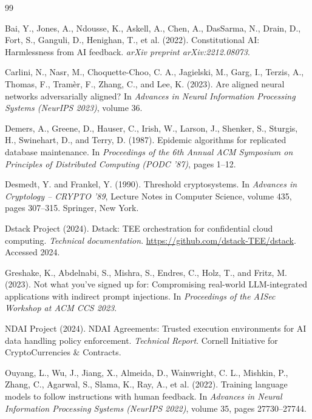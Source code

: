 \documentclass[sigconf,natbib=false]{acmart}
\begin{document}

\begin{thebibliography}{99}

Bai, Y., Jones, A., Ndousse, K., Askell, A., Chen, A., DasSarma, N.,
Drain, D., Fort, S., Ganguli, D., Henighan, T., et al. (2022).
Constitutional AI: Harmlessness from AI feedback.
\textit{arXiv preprint arXiv:2212.08073}.

Carlini, N., Nasr, M., Choquette-Choo, C. A., Jagielski, M.,
Garg, I., Terzis, A., Thomas, F., Tramèr, F., Zhang, C., and
Lee, K. (2023).
Are aligned neural networks adversarially aligned?
In \textit{Advances in Neural Information Processing Systems (NeurIPS 2023)},
volume 36.

Demers, A., Greene, D., Hauser, C., Irish, W., Larson, J., Shenker, S.,
Sturgis, H., Swinehart, D., and Terry, D. (1987).
Epidemic algorithms for replicated database maintenance.
In \textit{Proceedings of the 6th Annual ACM Symposium on Principles of
Distributed Computing (PODC '87)}, pages 1--12.

Desmedt, Y. and Frankel, Y. (1990).
Threshold cryptosystems.
In \textit{Advances in Cryptology -- CRYPTO '89}, Lecture Notes in Computer
Science, volume 435, pages 307--315. Springer, New York.

Dstack Project (2024).
Dstack: TEE orchestration for confidential cloud computing.
\textit{Technical documentation}. \url{https://github.com/dstack-TEE/dstack}.
Accessed 2024.

Greshake, K., Abdelnabi, S., Mishra, S., Endres, C., Holz, T., and
Fritz, M. (2023).
Not what you've signed up for: Compromising real-world LLM-integrated
applications with indirect prompt injections.
In \textit{Proceedings of the AISec Workshop at ACM CCS 2023}.

NDAI Project (2024).
NDAI Agreements: Trusted execution environments for AI data handling
policy enforcement.
\textit{Technical Report}. Cornell Initiative for CryptoCurrencies \& Contracts.

Ouyang, L., Wu, J., Jiang, X., Almeida, D., Wainwright, C. L.,
Mishkin, P., Zhang, C., Agarwal, S., Slama, K., Ray, A., et al. (2022).
Training language models to follow instructions with human feedback.
In \textit{Advances in Neural Information Processing Systems (NeurIPS 2022)},
volume 35, pages 27730--27744.


\end{thebibliography}
\end{document}
